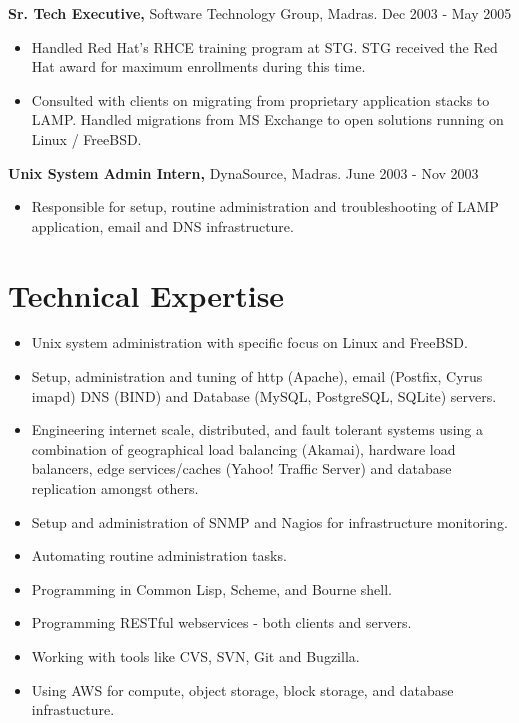 \documentclass[margin]{res}
\begin{document}
\begin{resume}
\begin{itemize}
 \end{itemize}

{\bf Sr. Tech Executive,} Software Technology Group, Madras. \hfill Dec 2003 - May 2005
 \begin{itemize} \itemsep -2pt
 \item Handled Red Hat's RHCE training program at STG. STG received the Red Hat
   award for maximum enrollments during this time.
 \item Consulted with clients on migrating from proprietary application stacks
   to LAMP. Handled migrations from MS Exchange to open solutions running on 
   Linux / FreeBSD.
   
 \end{itemize}

{\bf Unix System Admin Intern,} DynaSource, Madras. \hfill June 2003 - Nov 2003
 \begin{itemize} \itemsep -2pt
 \item Responsible for setup, routine administration and troubleshooting 
   of LAMP \\ application, email and DNS infrastructure.
   
 \end{itemize}

\section{Technical Expertise} 
 \begin{itemize} \itemsep -2pt
 \item Unix system administration with specific focus on Linux and FreeBSD.
 \item Setup, administration and tuning of http (Apache), email (Postfix, Cyrus imapd)
   DNS (BIND) and Database (MySQL, PostgreSQL, SQLite) servers.
 \item Engineering internet scale, distributed, and fault tolerant systems 
   using a \\ combination of geographical load balancing (Akamai), hardware load 
   balancers, edge services/caches (Yahoo! Traffic Server) and database replication 
   amongst others.
 \item Setup and administration of SNMP and Nagios for infrastructure monitoring.
 \item Automating routine administration tasks.
 \item Programming in Common Lisp, Scheme, and Bourne shell.
 \item Programming RESTful webservices - both clients and servers.
 \item Working with tools like CVS, SVN, Git and Bugzilla.
 \item Using AWS for compute, object storage, block storage, and database infrastucture.


\end{itemize}
\end{resume}
\end{document}
